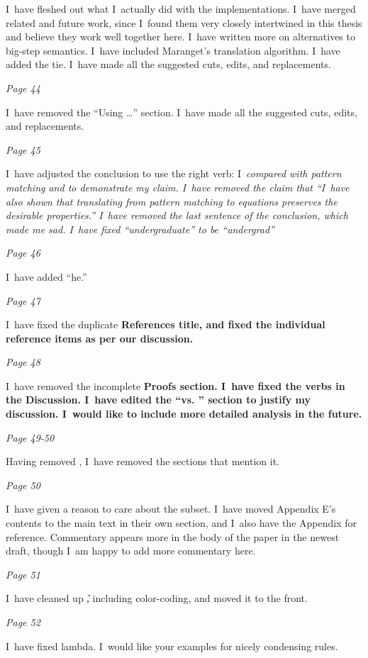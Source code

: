 \documentclass[manuscript,screen, 12pt, nonacm]{acmart}
\begin{document}
I~have fleshed out what I~actually did with the implementations. I~have merged
related and future work, since I~found them very closely intertwined in this
thesis and believe they work well together here. I~have written more on
alternatives to big-step semantics. I~have included Maranget's translation
algorithm. I~have added the tie. I~have made all the suggested cuts, edits, and
replacements. 

\it{Page 44}

I~have removed the “Using \VMinus\dots” section. I~have made all the suggested
cuts, edits, and replacements. 

\it{Page 45}

I~have adjusted the conclusion to use the right verb: I~\it{compared} \VMinus
with pattern matching and \VC to demonstrate my claim. I~have removed the claim
that “I~have also shown that translating from pattern matching to equations
preserves the desirable properties.” I~have removed the last sentence of the
conclusion, which made me sad. I~have fixed “undergraduate” to be “undergrad”

\it{Page 46}

I~have added “he.”

\it{Page 47}

I~have fixed the duplicate \bf{References} title, and fixed the individual
reference items as per our discussion. 

\it{Page 48}

I~have removed the incomplete \bf{Proofs} section. I~have fixed the verbs in the
Discussion. I~have edited the “\VMinus vs. \VC” section to justify my
discussion. I~would like to include more detailed analysis in the future. 

\it{Page 49-50}

Having removed \PPlus, I~have removed the sections that mention it. 

\it{Page 50}

I~have given a reason to care about the subset. I~have moved Appendix E's
contents to the main text in their own section, and I~also have the Appendix for
reference. Commentary appears more in the body of the paper in the newest draft,
though I~am happy to add more commentary here. 

\it{Page 51}

I~have cleaned up \U, including color-coding, and moved it to the front.

\it{Page 52}

I~have fixed lambda. I~would like your examples for nicely condensing rules. 
\end{document}
